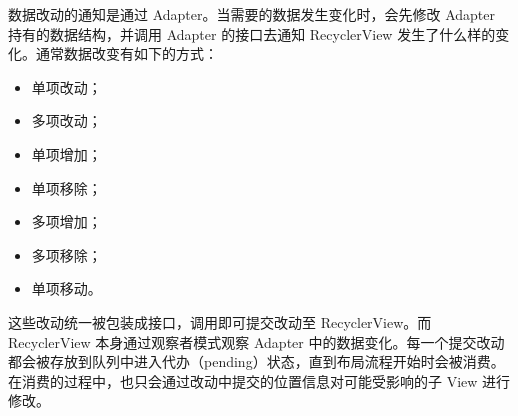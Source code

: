 数据改动的通知是通过 Adapter。当需要的数据发生变化时，会先修改 Adapter 持有的数据结构，并调用 Adapter 的接口去通知 RecyclerView 发生了什么样的变化。通常数据改变有如下的方式：

\begin{itemize}
    \item 单项改动；
    \item 多项改动；
    \item 单项增加；
    \item 单项移除；
    \item 多项增加；
    \item 多项移除；
    \item 单项移动。
\end{itemize}

这些改动统一被包装成接口，调用即可提交改动至 RecyclerView。而 RecyclerView 本身通过观察者模式观察 Adapter 中的数据变化。每一个提交改动都会被存放到队列中进入代办（pending）状态，直到布局流程开始时会被消费。在消费的过程中，也只会通过改动中提交的位置信息对可能受影响的子 View 进行修改。